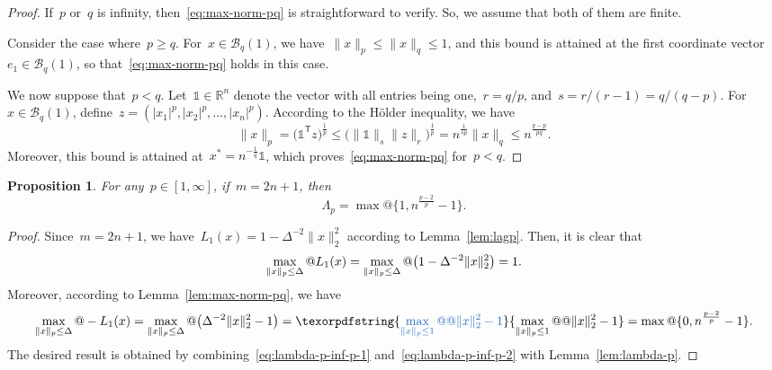 \documentclass{article}
\numberwithin{equation}{section}
\theoremstyle{definition}
\theoremstyle{plain}
\newtheorem{proposition}{Proposition}[section]
\theoremstyle{remark}
\newcommand*{\abs}[2][]{#1\lvert#2#1\rvert}
\newcommand*{\norm}[2][]{#1\lVert#2#1\rVert}
\newcommand*{\set}[2][]{#1\{#2#1\}}
\newcommand*{\R}{\mathbb{R}}
\newcommand*{\T}{\mathsf{T}}
\newcommand*{\lagp}[1][]{L\ifblank{#1}{}{_{#1}}}
\newcommand*{\ones}{\mathbb{1}}
\newcommand{\reviewed}[1]{\texorpdfstring{{\color{NavyBlue}#1}}{#1}}
\begin{document}
\begin{proof}
    If~$p$ or~$q$ is infinity, then~\eqref{eq:max-norm-pq} is straightforward to verify.
    So, we assume that both of them are finite.

    Consider the case where~$p \ge q$.
    For~$x \in \mathcal{B}_q(1)$, we have~$\norm{x}_p \le \norm{x}_q \le 1$, and this bound is attained at the first coordinate vector~$e_1 \in \mathcal{B}_q(1)$, so that~\eqref{eq:max-norm-pq} holds in this case.

    We now suppose that~$p < q$.
    Let~$\ones \in \R^n$ denote the vector with all entries being one,~$r = q/p$, and~$s = r / (r - 1) = q / (q - p)$.
    For~$x \in \mathcal{B}_q(1)$, define~$z = (\abs{x_1}^p, \abs{x_2}^p, \dots, \abs{x_n}^p)$.
    According to the H{\"{o}}lder inequality, we have
    \begin{equation*}
        \norm{x}_p  = \big(\ones^{\T} z \big)^{\frac{1}{p}} \le \big(\norm{\ones}_s \norm{z}_r \big)
        ^{\frac{1}{p}} = n^{\frac{1}{sp}} \norm{x}_q \le n^{\frac{q - p}{pq}}.
    \end{equation*}
    Moreover, this bound is attained at~$x^\ast = n^{-\frac{1}{q}} \ones$, which proves~\eqref{eq:max-norm-pq} for~$p < q$.
\end{proof}

\begin{proposition}
    \label{prop:lambda-p-opt}
    For any~$p \in [1,\infty]$, if~$m = 2n + 1$, then
    \begin{equation*}
        \Lambda_p = \max @ \set[\big]{1, n^{\frac{p - 2}{p}} - 1}.
    \end{equation*}
\end{proposition}

\begin{proof}
    Since~$m = 2n + 1$, we have~$L_1(x) = 1 - \Delta^{-2}\norm{x}_2^2$ according to Lemma~\ref{lem:lagp}.
    Then, it is clear that
    \begin{equation}
        \label{eq:lambda-p-inf-p-1}
        \max_{\norm{x}_p \le \Delta} @ \lagp[1](x) = \max_{\norm{x}_p \le \Delta} @ \big( 1 - \Delta^{-2}{\norm{x}_2^2} \big) = 1.
    \end{equation}
    Moreover, according to Lemma~\ref{lem:max-norm-pq}, we have
    \begin{equation}
        \label{eq:lambda-p-inf-p-2}
        \max_{\norm{x}_p \le \Delta} @ -\lagp[1](x) = \max_{\norm{x}_p \le \Delta} @ \big( \Delta^{-2} \norm{x}_2^2 - 1 \big) = \reviewed{\max_{\norm{x}_p \le 1} @@ \norm{x}_2^2 - 1} = \max @ \set{0, n^{\frac{p - 2}{p}} - 1}.
    \end{equation}
    The desired result is obtained by combining~\eqref{eq:lambda-p-inf-p-1} and~\eqref{eq:lambda-p-inf-p-2} with Lemma~\ref{lem:lambda-p}.
\end{proof}
\end{document}
